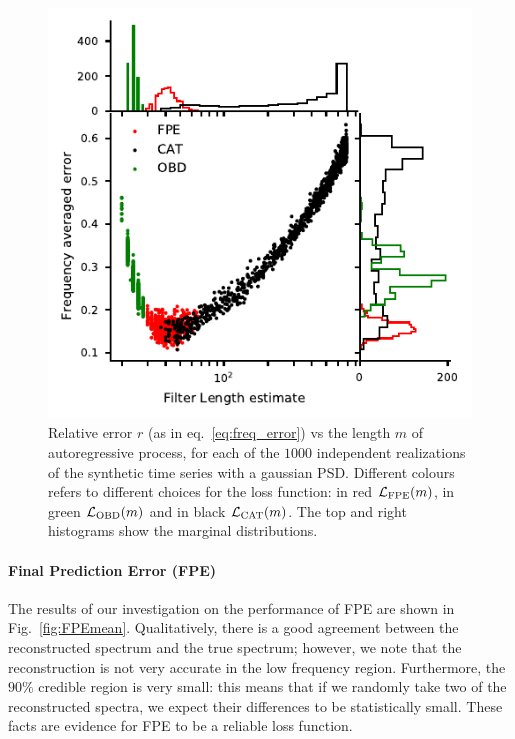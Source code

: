 \documentclass[twocolumn,showpacs,preprintnumbers,nofootinbib,prd,
superscriptaddress,10pt]{revtex4-1}
\begin{document}
\begin{figure}
	\centering
	\includegraphics[width = \linewidth]{Images/optimisers_comparison/normal/error_length_contour.pdf}
	\caption{Relative error $r$ (as in eq.~\eqref{eq:freq_error}) vs the length $m$ of autoregressive process, for each of the $1000$ independent realizations of the synthetic time series with a gaussian PSD. Different colours refers to different choices for the loss function: in red $\mathcal{L}_{\rm FPE}(m)$, in green $\mathcal{L}_{\rm OBD}(m)$ and in black $\mathcal{L}_{\rm CAT}(m)$. The top and right histograms show the marginal distributions.}
	\label{fig:optcomparison}
\end{figure}

\paragraph{Final Prediction Error (FPE)}
The results of our investigation on the performance of FPE are shown in Fig.~\ref{fig:FPEmean}.
Qualitatively, there is a good agreement between the reconstructed spectrum and the true spectrum; 
however, we note that the reconstruction is not very accurate in the low frequency region. 
Furthermore, the $90\%$ credible region is very small: this means that if we randomly take two of the reconstructed spectra, we expect their differences to be statistically small. These facts are evidence for FPE to be a reliable loss function.
\end{document}
